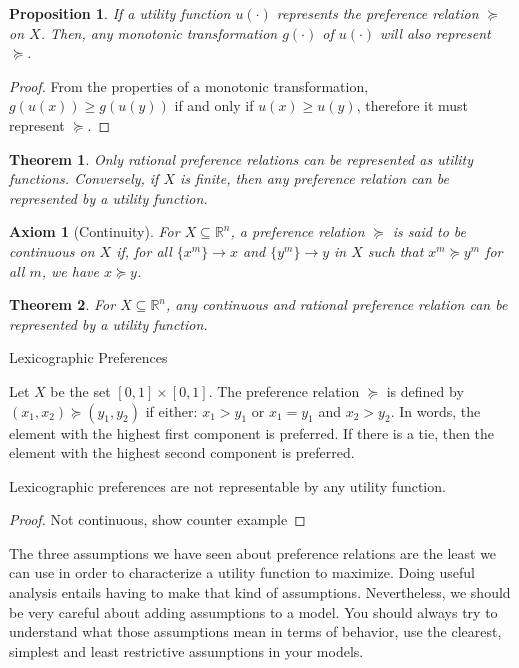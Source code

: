 \documentclass[12pt]{report}
\newtheorem{theorem}{Theorem}[chapter]
\newtheorem{proposition}{Proposition}[chapter]
\newtheorem{axiom}{Axiom}[chapter]
\begin{document}
\begin{proposition}
If a utility function $u(\cdot)$ represents the preference relation $\succeq$ on $X$. Then, any monotonic transformation $g(\cdot)$ of $u(\cdot)$ will also represent $\succeq$.
\end{proposition}

\begin{proof}
From the properties of a monotonic transformation, $g(u(x))\geq g(u(y))$ if and only if $u(x)\geq u(y)$, therefore it must represent $\succeq$. 
\end{proof}

\begin{theorem}
Only rational preference relations can be represented as utility functions. Conversely, if $X$ is finite, then any preference relation can be represented by a utility function.
\end{theorem}

\begin{axiom}[Continuity]
For $X\subseteq\mathbb{R}^n$, a preference relation $\succeq$ is said to be continuous on $X$ if, for all $\{x^m\}\to x$ and $\{y^m\}\to y$ in $X$ such that $x^m\succeq y^m$ for all $m$, we have $x\succeq y$.
\end{axiom}

\begin{theorem}
For $X\subseteq\mathbb{R}^n$, any continuous and rational preference relation can be represented by a utility function.
\end{theorem}

\begin{bclogo}[couleur=blue!10, arrondi=0.1, logo=,ombre=false]{ Lexicographic Preferences} 
\begin{small}
Let $X$ be the set $[0,1]\times [0,1]$. The preference relation $\succeq$ is defined by $(x_1, x_2)\succeq (y_1, y_2)$ if either: $x_1>y_1$ or $x_1 = y_1$ and $x_2 > y_2$. In words, the element with the highest first component is preferred. If there is a tie, then the element with the highest second component is preferred.

Lexicographic preferences are not representable by any utility function. \begin{proof}
Not continuous, show counter example
\end{proof}
\end{small}
\end{bclogo}

The three assumptions we have seen about preference relations are the least we can use in order to characterize a utility function to maximize. Doing useful analysis entails having to make that kind of assumptions. Nevertheless, we should be very careful about adding assumptions to a model. You should always try to understand what those assumptions mean in terms of behavior, use the clearest, simplest and least restrictive assumptions in your models.
\end{document}
